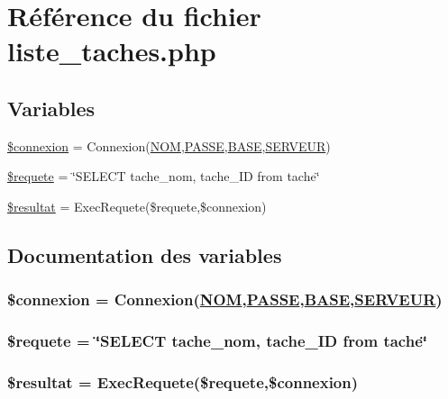 \hypertarget{liste__taches_8php}{
\section{R\'{e}f\'{e}rence du fichier liste\_\-taches.php}
\label{liste__taches_8php}
}
\subsection*{Variables}
\begin{CompactItemize}
\item 
\hyperlink{liste__taches_8php_a0}{\$connexion} = Connexion(\hyperlink{pma__connect_8php_a0}{NOM},\hyperlink{pma__connect_8php_a1}{PASSE},\hyperlink{pma__connect_8php_a3}{BASE},\hyperlink{pma__connect_8php_a2}{SERVEUR})
\item 
\hyperlink{liste__taches_8php_a1}{\$requete} = \char`\"{}SELECT tache\_\-nom, tache\_\-ID from tache\char`\"{}
\item 
\hyperlink{liste__taches_8php_a2}{\$resultat} = Exec\-Requete(\$requete,\$connexion)
\end{CompactItemize}


\subsection{Documentation des variables}
\hypertarget{liste__taches_8php_a0}{
\subsubsection[\$connexion]{\setlength{\rightskip}{0pt plus 5cm}\$connexion = Connexion(\hyperlink{pma__connect_8php_a0}{NOM},\hyperlink{pma__connect_8php_a1}{PASSE},\hyperlink{pma__connect_8php_a3}{BASE},\hyperlink{pma__connect_8php_a2}{SERVEUR})}}
\label{liste__taches_8php_a0}


\hypertarget{liste__taches_8php_a1}{
\subsubsection[\$requete]{\setlength{\rightskip}{0pt plus 5cm}\$requete = \char`\"{}SELECT tache\_\-nom, tache\_\-ID from tache\char`\"{}}}
\label{liste__taches_8php_a1}


\hypertarget{liste__taches_8php_a2}{
\subsubsection[\$resultat]{\setlength{\rightskip}{0pt plus 5cm}\$resultat = Exec\-Requete(\$requete,\$connexion)}}
\label{liste__taches_8php_a2}


